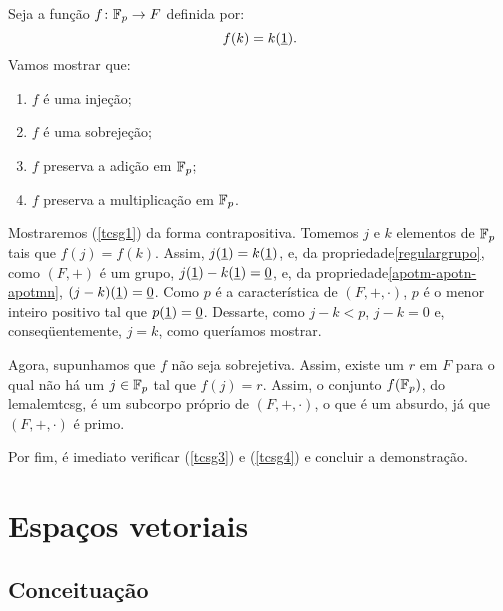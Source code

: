 \begin{dem}
  Seja a função $f\colon \mathbb{F}_{p}\rightarrow F$ definida por:
  \begin{equation*}
    f(k) = k(\underline{1})\mathrm{.}
  \end{equation*}
  Vamos mostrar que:
  \begin{enumerate}
    \item\label{tcsg1} $f$ é uma injeção;
    \item\label{tcsg2} $f$ é uma sobrejeção;
    \item\label{tcsg3} $f$ preserva a adição em $\mathbb{F}_{p}$;
    \item\label{tcsg4} $f$ preserva a multiplicação em $\mathbb{F}_{p}$.
  \end{enumerate}

  Mostraremos (\ref{tcsg1}) da forma contrapositiva. Tomemos $j$ e $k$
  elementos de $\mathbb{F}_{p}$ tais que $f(j) = f(k)$. Assim,
  $j(\underline{1}) = k(\underline{1})$, e, da propriedade\xspace\ref{regulargrupo},
  como $(F,+)$ é um grupo, $j(\underline{1})-k(\underline{1})=\underline{0}$, e, da
  propriedade\xspace\ref{apotm-apotn-apotmn}, $(j-k)(\underline{1}) = \underline{0}$. Como
  $p$ é a característica de $(F,+,\cdot)$, $p$ é o menor inteiro
  positivo tal que $p(\underline{1}) = \underline{0}$. Dessarte, como $j-k<p$, $j-k=0$ e,
  conseqüentemente, $j=k$, como queríamos mostrar.

  Agora, supunhamos que $f$ não seja sobrejetiva. Assim, existe um $r$
  em $F$ para o qual não há um $j\in\mathbb{F}_{p}$ tal que $f(j)=r$. Assim,
  o conjunto $f(\mathbb{F}_{p})$, do lema\xspace{lemtcsg}, é um subcorpo
  próprio de $(F,+,\cdot)$, o que é um absurdo, já que $(F,+,\cdot)$ é
  primo.

  Por fim, é imediato verificar (\ref{tcsg3}) e (\ref{tcsg4}) e concluir
  a demonstração.
\end{dem}

\section{Espaços vetoriais}

\subsection{Conceituação}

